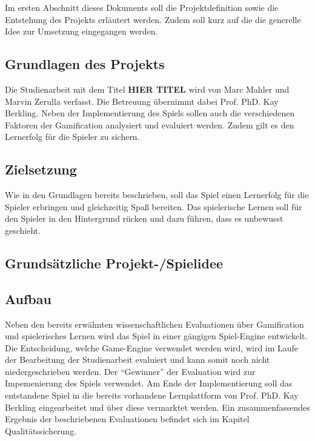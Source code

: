 Im ersten Abschnitt dieses Dokuments soll die Projektdefinition sowie die Entstehung des Projekts erläutert werden. Zudem soll kurz auf die die generelle Idee zur Umsetzung eingegangen werden.

\subsection{Grundlagen des Projekts}
Die Studienarbeit mit dem Titel \textbf{HIER TITEL} wird von Marc Mahler und Marvin Zerulla verfasst. Die Betreuung übernimmt dabei Prof. PhD. Kay Berkling. Neben der Implementierung des Spiels sollen auch die verschiedenen Faktoren der Gamification analysiert und evaluiert werden. Zudem gilt es den Lernerfolg für die Spieler zu sichern.

\subsection{Zielsetzung}
Wie in den Grundlagen bereits beschrieben, soll das Spiel einen Lernerfolg für die Spieler erbringen und gleichzeitig Spaß bereiten.
Das spielerische Lernen soll für den Spieler in den Hintergrund rücken und dazu führen, dass es unbewusst geschieht.

\subsection{Grundsätzliche Projekt-/Spielidee}


\subsection{Aufbau}
Neben den bereits erwähnten wissenschaftlichen Evaluationen über Gamification und spielerisches Lernen wird das Spiel in einer gängigen Spiel-Engine entwickelt.
Die Entscheidung, welche Game-Engine verwendet werden wird, wird im Laufe der Bearbeitung der Studienarbeit evaluiert und kann somit noch nicht niedergeschrieben werden. Der \enquote{Gewinner} der Evaluation wird zur Impemenierung des Spiels verwendet.
Am Ende der Implementierung soll das entstandene Spiel in die bereits vorhandene Lernplattform von Prof. PhD. Kay Berkling eingearbeitet und über diese vermarktet werden.
Ein zusammenfassendes Ergebnis der beschriebenen Evaluationen befindet sich im Kapitel Qualitätssicherung.